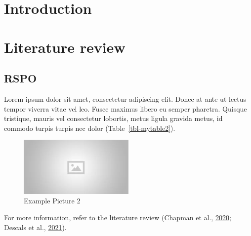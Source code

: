 \documentclass[
  letterpaper,
  DIV=11,
  numbers=noendperiod]{scrreprt}
\renewcommand*\contentsname{Table of contents}
\newcommand\contentsname{Table of contents}
\begin{document}
\newpage

\ifdefined\Shaded\renewenvironment{Shaded}{\begin{tcolorbox}[interior hidden, enhanced, frame hidden, borderline west={3pt}{0pt}{shadecolor}, breakable, sharp corners, boxrule=0pt]}{\end{tcolorbox}}\fi

\renewcommand*\contentsname{Table of contents}
{
\hypersetup{linkcolor=}
\setcounter{tocdepth}{2}
\tableofcontents
}

\hypertarget{introduction}{%
\chapter{Introduction}\label{introduction}}


\hypertarget{literature-review}{%
\chapter{Literature review}\label{literature-review}}

\hypertarget{rspo}{%
\section{RSPO}\label{rspo}}

Lorem ipsum dolor sit amet, consectetur adipiscing elit. Donec at ante
ut lectus tempor viverra vitae vel leo. Fusce maximus libero eu semper
pharetra. Quisque tristique, mauris vel consectetur lobortis, metus
ligula gravida metus, id commodo turpis turpis nec dolor
(Table~\ref{tbl-mytable2}).

\begin{figure}

{\centering \includegraphics[width=0.5\textwidth,height=\textheight]{placeholder.jpg}

}

\caption{Example Picture 2}

\end{figure}

For more information, refer to the literature review (Chapman et al.,
\protect\hyperlink{ref-chapmanCompoundingImpactDeforestation2020}{2020};
Descals et al.,
\protect\hyperlink{ref-descalsHighresolutionGlobalMap2021}{2021}).
\end{document}
